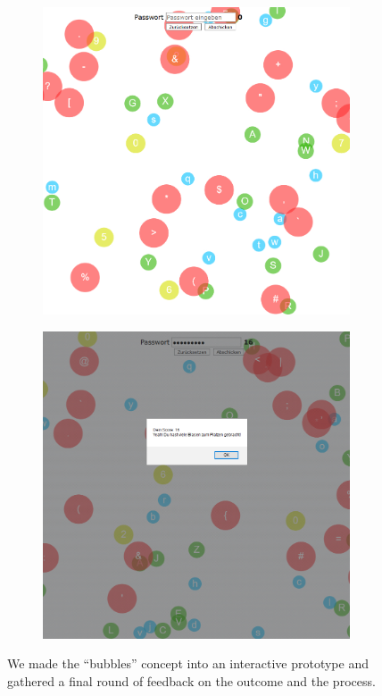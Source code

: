 \begin{figure}
	\centering
	\begin{subfigure}[!t]{0.45\textwidth}
		\includegraphics[width=\textwidth]{figures/co-design/bubbles-proto-1}
		\caption{\label{fig:co-design:bubbles-proto-1}}
	\end{subfigure}
	\begin{subfigure}[!t]{0.45\textwidth}
		\includegraphics[width=\textwidth]{figures/co-design/bubbles-proto-2}
		\caption{\label{fig:co-design:bubbles-proto-2}}
	\end{subfigure}
	\caption{\label{fig:co-design:bubbles-proto} We made the ``bubbles'' concept into an interactive prototype and gathered a final round of feedback on the outcome and the process.} 
\end{figure}

